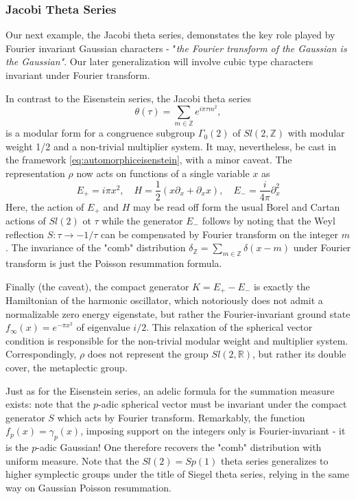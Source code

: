   \subsubsection{Jacobi Theta Series}
  Our next example, the Jacobi theta series, demonstates the key role played by
  Fourier invariant Gaussian characters - "\textit{the Fourier transform of the
  Gaussian is the Gaussian"}. Our later generalization will involve cubic type
  characters invariant under Fourier transform.
  \par In contrast to the Eisenstein series, the Jacobi theta series
  \begin{equation}
    \theta(\tau) = \sum_{m\in\mathbb{Z}}e^{i\pi\tau m^2},
  \end{equation}
  is a modular form for a  congruence subgroup $\Gamma_{0}(2)$ of
  $Sl(2,\mathbb{Z})$ with modular weight 1/2 and a non-trivial multiplier
  system. It may, nevertheless, be cast in the framework
  \eqref{eq:automorphiceisenstein}, with a minor caveat. The representation
  $\rho$ now acts on functions of a single variable $x$ as
  \begin{equation}
    E_{+} = i\pi x^2, \quad H = \frac{1}{2}(x\partial_x + \partial_x x), \quad
    E_{-} = \frac{i}{4\pi}\partial^2_x
  \end{equation}
  Here, the action of $E_{+}$ and $H$ may be read off form the usual Borel and
  Cartan actions of $Sl(2)$ ot $\tau$ while the generator $E_{-}$ follows by
  noting that the Weyl reflection $S:\tau\rightarrow -1/\tau$ can be
  compensated by Fourier transform on the integer $m$. The invariance of the
  "comb" distribution $\delta_{\mathbb{Z}} = \sum_{m\in\mathbb{Z}}\delta(x-m)$
  under Fourier transform is just the Poisson resummation formula.
  \par Finally (the caveat), the compact generator $K=E_{+} - E_{-}$ is exactly
  the Hamiltonian of the harmonic oscillator, which notoriously does not admit
  a normalizable zero energy eigenstate, but rather the Fourier-invariant
  ground state $f_{\infty}(x) = e^{-\pi x^2}$ of eigenvalue $i/2$. This
  relaxation of the spherical vector condition is responsible for the
  non-trivial modular weight and multiplier system. Correspondingly, $\rho$
  does not represent the group $Sl(2,\mathbb{R})$, but rather its double cover,
  the metaplectic group.
  \par Just as for the  Eisenstein series, an adelic formula for the summation
  measure exists: note that the $p$-adic spherical vector must be invariant
  under the compact generator $S$ which acts by Fourier transform. Remarkably,
  the function $f_p(x) = \gamma_p(x)$, imposing support on the integers only is
  Fourier-invariant - it is the $p$-adic Gaussian! One therefore recovers the
  "comb" distribution with uniform measure. Note that the $Sl(2)= Sp(1)$ theta
  series generalizes to higher symplectic groups under the  title of Siegel
  theta series, relying in the same way on Gaussian Poisson resummation.
